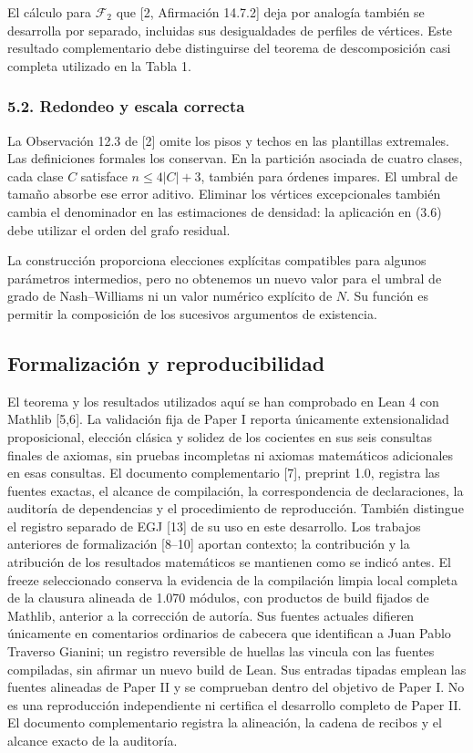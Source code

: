 \documentclass[spanish,11pt,a4paper]{article}
\begin{document}
El cálculo para \(\mathcal F_2\) que {[}2, Afirmación 14.7.2{]} deja por analogía también se desarrolla por separado, incluidas sus desigualdades de perfiles de vértices. Este resultado complementario debe distinguirse del teorema de descomposición casi completa utilizado en la Tabla 1.

\subsubsection{5.2. Redondeo y escala correcta}\label{redondeo-y-escala-correcta}

La Observación 12.3 de {[}2{]} omite los pisos y techos en las plantillas extremales. Las definiciones formales los conservan. En la partición asociada de cuatro clases, cada clase \(C\) satisface \(n\le4|C|+3\), también para órdenes impares. El umbral de tamaño absorbe ese error aditivo. Eliminar los vértices excepcionales también cambia el denominador en las estimaciones de densidad: la aplicación en (3.6) debe utilizar el orden del grafo residual.

La construcción proporciona elecciones explícitas compatibles para algunos parámetros intermedios, pero no obtenemos un nuevo valor para el umbral de grado de Nash--Williams ni un valor numérico explícito de \(N\). Su función es permitir la composición de los sucesivos argumentos de existencia.

\subsection{Formalización y reproducibilidad}\label{formalizaciuxf3n-y-reproducibilidad}

El teorema y los resultados utilizados aquí se han comprobado en Lean 4 con Mathlib {[}5,6{]}. La validación fija de Paper I reporta únicamente extensionalidad proposicional, elección clásica y solidez de los cocientes en sus seis consultas finales de axiomas, sin pruebas incompletas ni axiomas matemáticos adicionales en esas consultas. El documento complementario {[}7{]}, preprint 1.0, registra las fuentes exactas, el alcance de compilación, la correspondencia de declaraciones, la auditoría de dependencias y el procedimiento de reproducción. También distingue el registro separado de EGJ {[}13{]} de su uso en este desarrollo. Los trabajos anteriores de formalización {[}8--10{]} aportan contexto; la contribución y la atribución de los resultados matemáticos se mantienen como se indicó antes. El freeze seleccionado conserva la evidencia de la compilación limpia local completa de la clausura alineada de 1.070 módulos, con productos de build fijados de Mathlib, anterior a la corrección de autoría. Sus fuentes actuales difieren únicamente en comentarios ordinarios de cabecera que identifican a Juan Pablo Traverso Gianini; un registro reversible de huellas las vincula con las fuentes compiladas, sin afirmar un nuevo build de Lean. Sus entradas tipadas emplean las fuentes alineadas de Paper II y se comprueban dentro del objetivo de Paper I. No es una reproducción independiente ni certifica el desarrollo completo de Paper II. El documento complementario registra la alineación, la cadena de recibos y el alcance exacto de la auditoría.
\end{document}
